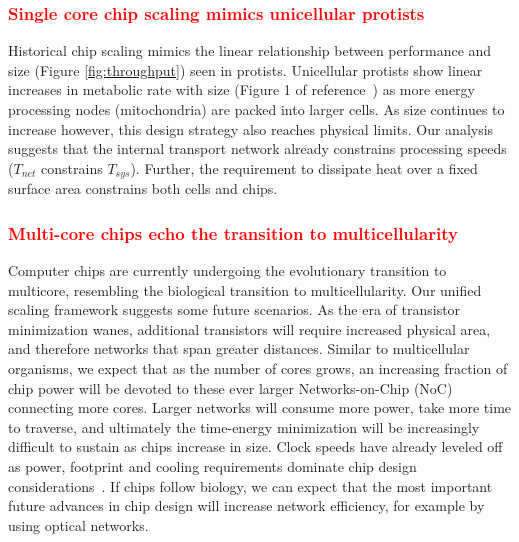 \documentclass[12pt]{article}
\newcommand{\red}[1]{\textcolor{red}{#1}}
\begin{document}
\red {\subsubsection{Single core chip scaling mimics unicellular protists}} Historical chip scaling mimics the linear relationship between performance and
size (Figure \ref{fig:throughput}) seen in protists. Unicellular protists show linear increases
in metabolic rate with size (Figure 1 of reference~\cite{delong2010shifts}) as more energy processing nodes (mitochondria) are
packed into larger cells. As size continues to increase however, this
design strategy also reaches physical limits.  Our analysis suggests that the
internal transport network already constrains processing speeds
($T_{net}$ constrains $T_{sys}$). Further, the requirement to
dissipate heat over a fixed surface area constrains both cells and chips. 

\red{\subsubsection{Multi-core chips echo the transition to multicellularity}} Computer chips are currently undergoing
the evolutionary transition to multicore, resembling the biological
transition to multicellularity. Our unified scaling framework suggests
some future scenarios. As the era of transistor minimization wanes,
additional transistors will require increased physical area, and
therefore networks that span greater distances. Similar to
multicellular organisms, we expect that as the number of cores grows,
an increasing fraction of chip power will be devoted to these ever
larger Networks-on-Chip (NoC) connecting more cores. Larger networks
will consume more power, take more time to traverse, and ultimately
the time-energy minimization will be increasingly difficult to sustain
as chips increase in size.  Clock speeds have already leveled off as 
power, footprint and
cooling requirements 
dominate chip design
considerations~\cite{waldrop2016chips}.  If chips follow biology, we can expect
that the most important future advances in chip
design will increase network efficiency, for example by using optical
networks.
\end{document}
